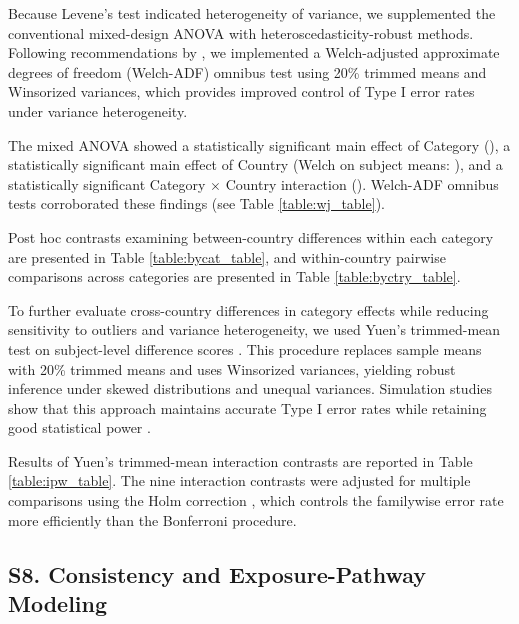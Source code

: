 Because Levene's test indicated heterogeneity of variance, we supplemented the conventional mixed-design ANOVA with heteroscedasticity-robust methods. Following recommendations by \cite{delacre2019taking}, we implemented a Welch-adjusted approximate degrees of freedom (Welch-ADF) omnibus test using 20\% trimmed means and Winsorized variances, which provides improved control of Type I error rates under variance heterogeneity.

The mixed ANOVA showed a statistically significant main effect of Category (), a statistically significant main effect of Country (Welch on subject means: ), and a statistically significant Category $\times$ Country interaction (). Welch-ADF omnibus tests corroborated these findings (see Table \ref{table:wj_table}).



Post hoc contrasts examining between-country differences within each category are presented in Table \ref{table:bycat_table}, and within-country pairwise comparisons across categories are presented in Table \ref{table:byctry_table}.





To further evaluate cross-country differences in category effects while reducing sensitivity to outliers and variance heterogeneity, we used Yuen's trimmed-mean test on subject-level difference scores \citep{yuen1974two}. This procedure replaces sample means with 20\% trimmed means and uses Winsorized variances, yielding robust inference under skewed distributions and unequal variances. Simulation studies show that this approach maintains accurate Type I error rates while retaining good statistical power \citep{wilcox2017modern}.

Results of Yuen's trimmed-mean interaction contrasts are reported in Table \ref{table:ipw_table}. The nine interaction contrasts were adjusted for multiple comparisons using the Holm correction \citep{holm1979simple}, which controls the familywise error rate more efficiently than the Bonferroni procedure.



\subsection{S8. Consistency and Exposure-Pathway Modeling}

